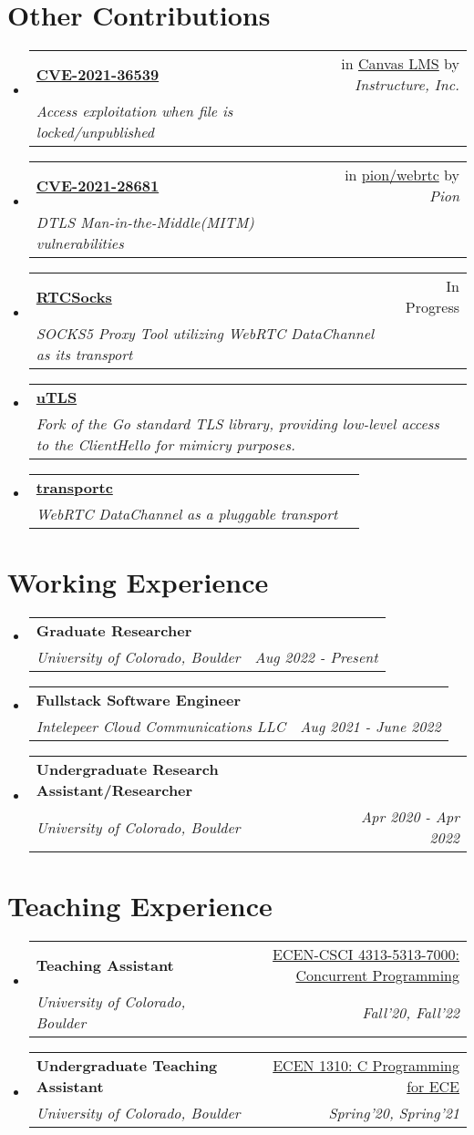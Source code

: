 \documentclass[letterpaper,11pt]{article}
\makeatletter
\newcommand{\resumeSubheading}[4]{
  \vspace{-2pt}\item
    \begin{tabular*}{0.97\textwidth}[t]{l@{\extracolsep{\fill}}r}
      \textbf{#1} & #2 \\
      \textit{\small#3} & \textit{\small #4} \\
    \end{tabular*}\vspace{-7pt}
}
\newcommand{\resumeSubHeadingListStart}{\begin{itemize}[leftmargin=0.15in, label={}]}
\newcommand{\resumeSubHeadingListEnd}{\end{itemize}}
\makeatother
\begin{document}
\section{Other Contributions}
\resumeSubHeadingListStart
\resumeSubheading
{\href{https://cve.mitre.org/cgi-bin/cvename.cgi?name=CVE-2021-36539}{\textbf{CVE-2021-36539}}}{in \href{https://www.instructure.com/canvas}{Canvas LMS} by \emph{Instructure, Inc.}}
{Access exploitation when file is locked/unpublished}{}
\resumeSubheading
{\href{https://cve.mitre.org/cgi-bin/cvename.cgi?name=CVE-2021-28681}{\textbf{CVE-2021-28681}}}{in \href{https://github.com/pion/webrtc}{pion/webrtc} by \emph{Pion}}
{DTLS Man-in-the-Middle(MITM) vulnerabilities}{}
\resumeSubheading
{\href{https://github.com/Gaukas/rtcsocks}{\textbf{RTCSocks}}}{In Progress}
{SOCKS5 Proxy Tool utilizing WebRTC DataChannel as its transport}{}
\resumeSubheading
{\href{https://github.com/refraction-networking/utls}{\textbf{uTLS}}}{}
{Fork of the Go standard TLS library, providing low-level access to the ClientHello for mimicry purposes.}{}
\resumeSubheading
{\href{https://github.com/Gaukas/transportc}{\textbf{transportc}}}{}
{WebRTC DataChannel as a pluggable transport}{}
\resumeSubHeadingListEnd
\vspace{1pt}

\section{Working Experience}
\resumeSubHeadingListStart
\resumeSubheading
{Graduate Researcher}{}
{University of Colorado, Boulder}{Aug 2022 - Present}
\resumeSubheading
{Fullstack Software Engineer}{}
{Intelepeer Cloud Communications LLC}{Aug 2021 - June 2022}
\resumeSubheading
{Undergraduate Research Assistant/Researcher}{}
{University of Colorado, Boulder}{Apr 2020 - Apr 2022}
\resumeSubHeadingListEnd
\vspace{1pt}

\section{Teaching Experience}
\resumeSubHeadingListStart
\resumeSubheading
{Teaching Assistant}{\href{https://experts.colorado.edu/display/coursename_ECEN-4313}{ECEN-CSCI 4313-5313-7000: Concurrent Programming}}
{University of Colorado, Boulder}{Fall'20, Fall'22}
\resumeSubheading
{Undergraduate Teaching Assistant}{\href{https://experts.colorado.edu/display/coursename_ECEN-1310}{ECEN 1310: C Programming for ECE}}
{University of Colorado, Boulder}{Spring'20, Spring'21}
\resumeSubHeadingListEnd
\vspace{1pt}
\end{document}
